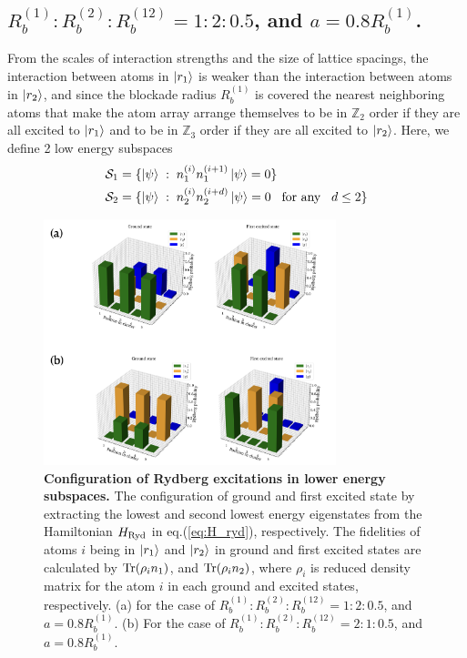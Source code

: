 \documentclass[%
 reprint,
nofootinbib,
 amsmath,amssymb,
 aps,
floatfix,
]{revtex4-2}
\begin{document}
\subsection{$R^{(1)}_b:R^{(2)}_b:R^{(12)}_b=1:2:0.5$, {\rm and} $a=0.8R^{(1)}_b$.} 
From the scales of interaction strengths and the size of lattice spacings, the interaction between atoms in $\ket{r_1}$ is weaker than the interaction between atoms in $\ket{r_2}$, and since the blockade radius $R^{(1)}_b$ is covered the nearest neighboring atoms that make the atom array arrange themselves to be in $\mathbb{Z}_2$ order if they are all excited to $\ket{r_1}$ and to be in $\mathbb{Z}_3$ order if they are all excited to $\ket{r_2}$. Here, we define 2 low energy subspaces 
\begin{align}\label{subspace_case1}
     & \mathcal{S}_1 = \{ \ket{\psi} \hspace{1mm} :\hspace{1mm} n^{(i)}_1 n^{(i+1)}_1 \ket{\psi} = 0  \} \nonumber \\
     & \mathcal{S}_2 = \{ \ket{\psi} \hspace{1mm} :\hspace{1mm} n^{(i)}_2 n^{(i+d)}_2 \ket{\psi} = 0 \hspace{3mm} \textit{\rm for any} \hspace{3mm} d \leq 2 \}
\end{align}
\begin{figure}[hbt!]
    \centering
    \includegraphics[width=8.5cm]{picture/case23_groundstate_barplot.png}
    \caption{\textbf{Configuration of Rydberg excitations in lower energy subspaces.} The configuration of ground and first excited state by extracting the lowest and second lowest energy eigenstates from the Hamiltonian $H_{\text{\rm Ryd}}$ in eq.(\ref{eq:H_ryd}), respectively. The fidelities of atoms $i$ being in $\ket{r_1}$ and $\ket{r_2}$ in ground and first excited states are calculated by $\textit{\rm Tr}(\rho_i n_1)$, and $\textit{\rm Tr}(\rho_i n_2)$, where $\rho_i$ is reduced density matrix for the atom $i$ in each ground and excited states, respectively. (a) for the case of $R^{(1)}_b:R^{(2)}_b:R^{(12)}_b=1:2:0.5$, and $a=0.8R^{(1)}_b$.  (b) For the case of  $R^{(1)}_b:R^{(2)}_b:R^{(12)}_b=2:1:0.5$, and $a=0.8R^{(1)}_b$.}
    \label{fig:case23_ground_barplot}
\end{figure}
\end{document}
